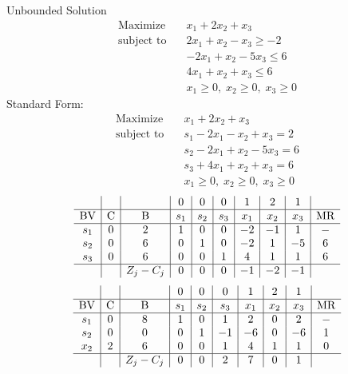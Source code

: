 \documentclass{article}
\begin{document}
Unbounded Solution\\
\begin{align*}
\text{Maximize} \quad & x_{1} + 2x_{2} + x_{3}\\
\text{subject to} \quad
& 2x_{1} + x_{2} - x_{3}\ge-2\\
& -2x_{1} + x_{2} - 5x_{3}\le6\\
& 4x_{1} + x_{2} + x_{3}\le6\\
& x_{1}\ge0,\; x_{2}\ge0,\; x_{3}\ge0\end{align*}
Standard Form:\\
\begin{align*}
\text{Maximize} \quad & x_{1} + 2x_{2} + x_{3}\\
\text{subject to} \quad
& s_{1} - 2x_{1} - x_{2} + x_{3}=2\\
& s_{2} - 2x_{1} + x_{2} - 5x_{3}=6\\
& s_{3} + 4x_{1} + x_{2} + x_{3}=6\\
& x_{1}\ge0,\; x_{2}\ge0,\; x_{3}\ge0\end{align*}
\begin{align*}
\begin{array}{c|c|c|c|c|c|c|c|c|c}
 &  &  & 0 & 0 & 0 & 1 & 2 & 1 & \\
\hline
\text{BV} & \text{C} & \text{B} & s_{1} & s_{2} & s_{3} & x_{1} & x_{2} & x_{3} & \text{MR} \\
\hline
s_{1} & 0 & 2 & 1 & 0 & 0 & -2 & -1 & 1 & - \\
s_{2} & 0 & 6 & 0 & 1 & 0 & -2 & 1 & -5 & 6 \\
s_{3} & 0 & 6 & 0 & 0 & 1 & 4 & 1 & 1 & 6 \\
\hline
 &  & Z_j-C_j & 0 & 0 & 0 & -1 & -2 & -1 & \\
\end{array}
\end{align*}
\begin{align*}
\begin{array}{c|c|c|c|c|c|c|c|c|c}
 &  &  & 0 & 0 & 0 & 1 & 2 & 1 & \\
\hline
\text{BV} & \text{C} & \text{B} & s_{1} & s_{2} & s_{3} & x_{1} & x_{2} & x_{3} & \text{MR} \\
\hline
s_{1} & 0 & 8 & 1 & 0 & 1 & 2 & 0 & 2 & - \\
s_{2} & 0 & 0 & 0 & 1 & -1 & -6 & 0 & -6 & 1 \\
x_{2} & 2 & 6 & 0 & 0 & 1 & 4 & 1 & 1 & 0 \\
\hline
 &  & Z_j-C_j & 0 & 0 & 2 & 7 & 0 & 1 & \\
\end{array}
\end{align*}
\end{document}
